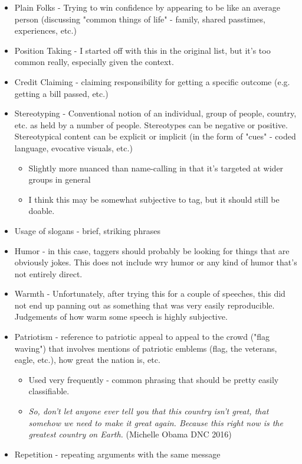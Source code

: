 \documentclass[letterpaper]{article}
\begin{document}
\begin{itemize}
	\item Plain Folks - Trying to win confidence by appearing to be like an average person (discussing "common things of life" - family, shared passtimes, experiences, etc.)
	\item Position Taking - I started off with this in the original list, but it's too common really, especially given the context.
	\item Credit Claiming - claiming responsibility for getting a specific outcome (e.g. getting a bill passed, etc.)
	\item Stereotyping - Conventional notion of an individual, group of people, country, etc. as held by a number of people.  Stereotypes can be negative or positive. Stereotypical content can be explicit or implicit (in the form of "cues" - coded language, evocative visuals, etc.)
		\begin{itemize}
			\item Slightly more nuanced than name-calling in that it's targeted at wider groups in general
			\item I think this may be somewhat subjective to tag, but it should still be doable.
		\end{itemize}
	\item Usage of slogans - brief, striking phrases
	\item Humor - in this case, taggers should probably be looking for things that are obviously jokes. This does not include wry humor or any kind of humor that's not entirely direct.
	\item Warmth - Unfortunately, after trying this for a couple of speeches, this did not end up panning out as something that was very easily reproducible. Judgements of how warm some speech is highly subjective.
	\item Patriotism - reference to patriotic appeal to appeal to the crowd ("flag waving") that involves mentions of patriotic emblems (flag, the veterans, eagle, etc.), how great the nation is, etc.
		\begin{itemize}
			\item Used very frequently - common phrasing that should be pretty easily classifiable.
			\item \emph{So, don’t let anyone ever tell you that this country isn’t great, that somehow we need to make it great again. Because this right now is the greatest country on Earth.} (Michelle Obama DNC 2016)
		\end{itemize}
	\item Repetition - repeating arguments with the same message

\end{itemize}
\end{document}
